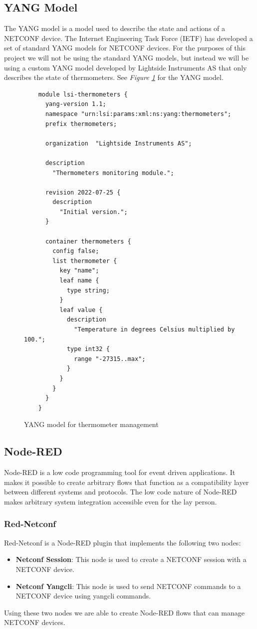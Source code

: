 \documentclass[12pt]{article}
\begin{document}
\subsection{YANG Model}
The YANG model is a model used to describe the state and actions of a NETCONF device.
The Internet Engineering Task Force (IETF) has developed a set of standard YANG models for NETCONF devices.
For the purposes of this project we will not be using the standard YANG models,
but instead we will be using a custom YANG model developed by Lightside Instruments AS that only 
describes the state of thermometers. See \textit{Figure \ref{fig:yang}} for the YANG model.
\begin{figure}
  \begin{verbatim}
    module lsi-thermometers {
      yang-version 1.1;
      namespace "urn:lsi:params:xml:ns:yang:thermometers";
      prefix thermometers;

      organization  "Lightside Instruments AS";

      description
        "Thermometers monitoring module.";

      revision 2022-07-25 {
        description
          "Initial version.";
      }

      container thermometers {
        config false;
        list thermometer {
          key "name";
          leaf name {
            type string;
          }
          leaf value {
            description
              "Temperature in degrees Celsius multiplied by 100.";
            type int32 {
              range "-27315..max";
            }
          }
        }
      }
    }
  \end{verbatim}
  \caption{YANG model for thermometer management}
  \label{fig:yang}
\end{figure}

\newpage

\subsection{Node-RED}
Node-RED is a low code programming tool for event driven applications.
It makes it possible to create arbitrary flows that function as a compatibility layer
between different systems and protocols. The low code nature of Node-RED makes arbitrary system
integration accessible even for the lay person.

\subsubsection{Red-Netconf}
Red-Netconf \cite{LightsideinstrumentsRednetconf} is a Node-RED plugin that implements the following two 
nodes:
\begin{itemize}
  \item \textbf{Netconf Session}: This node is used to create a NETCONF session with a NETCONF device.
  \item \textbf{Netconf Yangcli}: This node is used to send NETCONF commands to a NETCONF device using yangcli commands.
\end{itemize}
Using these two nodes we are able to create Node-RED flows that can manage NETCONF devices.
\end{document}
